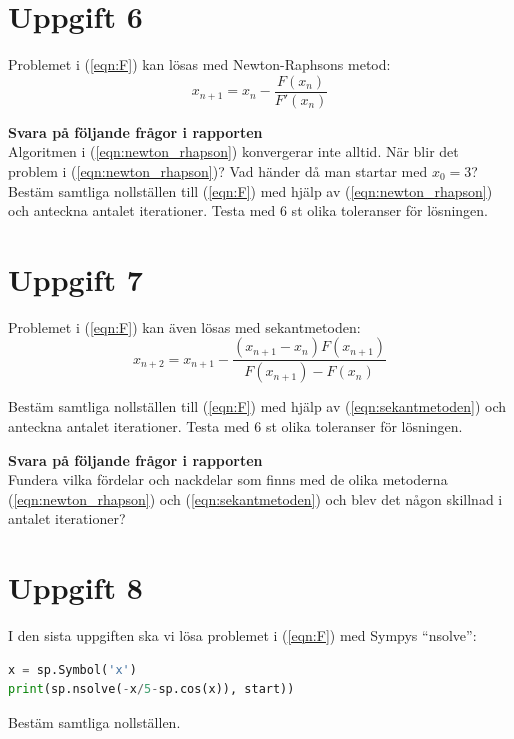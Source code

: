 \documentclass[a4paper]{article}
\begin{document}
\newpage
\section{Uppgift 6}
Problemet i (\ref{eqn:F}) kan lösas med Newton-Raphsons metod:
\begin{equation} \label{eqn:newton_rhapson}
x_{n+1}=x_n-\frac{F(x_n)}{F'(x_n)}
\end{equation}


\textbf{Svara på följande frågor i rapporten}\\
Algoritmen i (\ref{eqn:newton_rhapson}) konvergerar inte alltid. När blir det problem i (\ref{eqn:newton_rhapson})? 
Vad händer då man startar med \( x_0 = 3  \)? Bestäm samtliga nollställen
till (\ref{eqn:F}) med hjälp av (\ref{eqn:newton_rhapson}) och anteckna antalet
iterationer. Testa med 6 st olika toleranser för lösningen.


\newpage
\section{Uppgift 7}
Problemet i (\ref{eqn:F}) kan även lösas med sekantmetoden:
\begin{equation} \label{eqn:sekantmetoden}
    x_{n+2}=x_{n+1}-\frac{(x_{n+1}-x_n)F(x_{n+1})}{F(x_{n+1})-F(x_n)}
\end{equation}


Bestäm samtliga nollställen till (\ref{eqn:F}) med hjälp av 
(\ref{eqn:sekantmetoden}) och anteckna antalet iterationer. 
Testa med 6 st olika toleranser för lösningen.



\textbf{Svara på följande frågor i rapporten}\\
Fundera vilka fördelar och nackdelar som finns med de olika metoderna 
(\ref{eqn:newton_rhapson}) och (\ref{eqn:sekantmetoden}) och blev det 
någon skillnad i antalet iterationer?


\newpage
\section{Uppgift 8}
I den sista uppgiften ska vi lösa problemet i (\ref{eqn:F}) med Sympys ``nsolve'':

\begin{lstlisting}[language=Python]
x = sp.Symbol('x')
print(sp.nsolve(-x/5-sp.cos(x)), start))
\end{lstlisting}

Bestäm samtliga nollställen.
\end{document}
